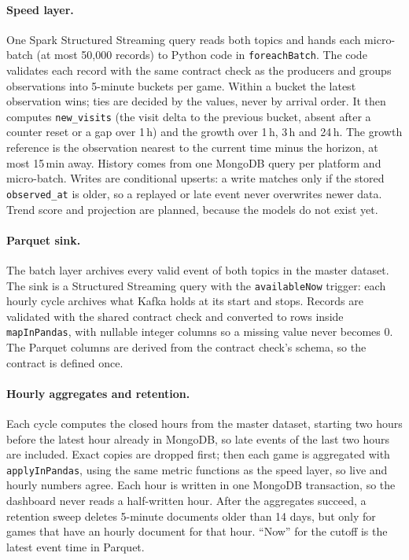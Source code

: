 \documentclass[10pt,a4paper]{article}
\newcommand{\ep}[1]{\texttt{\small #1}}
\begin{document}
\paragraph{Speed layer.} One Spark Structured Streaming query reads both topics and hands each micro-batch (at most 50,000 records) to Python code in \ep{foreachBatch}. The code validates each record with the same contract check as the producers and groups observations into 5-minute buckets per game. Within a bucket the latest observation wins; ties are decided by the values, never by arrival order. It then computes \ep{new\_visits} (the visit delta to the previous bucket, absent after a counter reset or a gap over 1\,h) and the growth over 1\,h, 3\,h and 24\,h. The growth reference is the observation nearest to the current time minus the horizon, at most 15\,min away. History comes from one MongoDB query per platform and micro-batch. Writes are conditional upserts: a write matches only if the stored \ep{observed\_at} is older, so a replayed or late event never overwrites newer data. Trend score and projection are planned, because the models do not exist yet.

\paragraph{Parquet sink.} The batch layer archives every valid event of both topics in the master dataset. The sink is a Structured Streaming query with the \ep{availableNow} trigger: each hourly cycle archives what Kafka holds at its start and stops. Records are validated with the shared contract check and converted to rows inside \ep{mapInPandas}, with nullable integer columns so a missing value never becomes 0. The Parquet columns are derived from the contract check's schema, so the contract is defined once.

\paragraph{Hourly aggregates and retention.} Each cycle computes the closed hours from the master dataset, starting two hours before the latest hour already in MongoDB, so late events of the last two hours are included. Exact copies are dropped first; then each game is aggregated with \ep{applyInPandas}, using the same metric functions as the speed layer, so live and hourly numbers agree. Each hour is written in one MongoDB transaction, so the dashboard never reads a half-written hour. After the aggregates succeed, a retention sweep deletes 5-minute documents older than 14 days, but only for games that have an hourly document for that hour. ``Now'' for the cutoff is the latest event time in Parquet.
\end{document}

